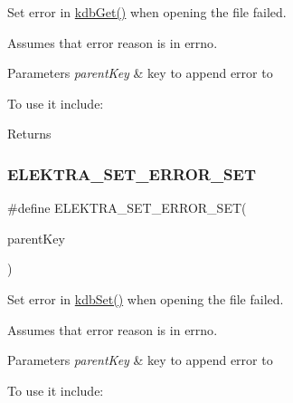 Set error in \mbox{\hyperlink{group__kdb_ga28e385fd9cb7ccfe0b2f1ed2f62453a1}{kdb\+Get()}} when opening the file failed. 

Assumes that error reason is in {\ttfamily errno}.


\begin{DoxyParams}{Parameters}
{\em parent\+Key} & key to append error to\\
\hline
\end{DoxyParams}
To use it include\+:


\begin{DoxyCodeInclude}{0}
\end{DoxyCodeInclude}

\begin{DoxyCodeInclude}{0}
\DoxyCodeLine{\textcolor{comment}{// using namespace ckdb; // for C++}}
\end{DoxyCodeInclude}
 \begin{DoxyReturn}{Returns}

\end{DoxyReturn}
\mbox{\label{group__plugin_gaf526686f01dbacd68671732aad4b5d76}} 
\subsubsection{\texorpdfstring{ELEKTRA\_SET\_ERROR\_SET}{ELEKTRA\_SET\_ERROR\_SET}}
{\footnotesize\ttfamily \#define E\+L\+E\+K\+T\+R\+A\+\_\+\+S\+E\+T\+\_\+\+E\+R\+R\+O\+R\+\_\+\+S\+ET(\begin{DoxyParamCaption}\item[{}]{parent\+Key }\end{DoxyParamCaption})}



Set error in \mbox{\hyperlink{group__kdb_ga11436b058408f83d303ca5e996832bcf}{kdb\+Set()}} when opening the file failed. 

Assumes that error reason is in {\ttfamily errno}.


\begin{DoxyParams}{Parameters}
{\em parent\+Key} & key to append error to\\
\hline
\end{DoxyParams}
To use it include\+:


